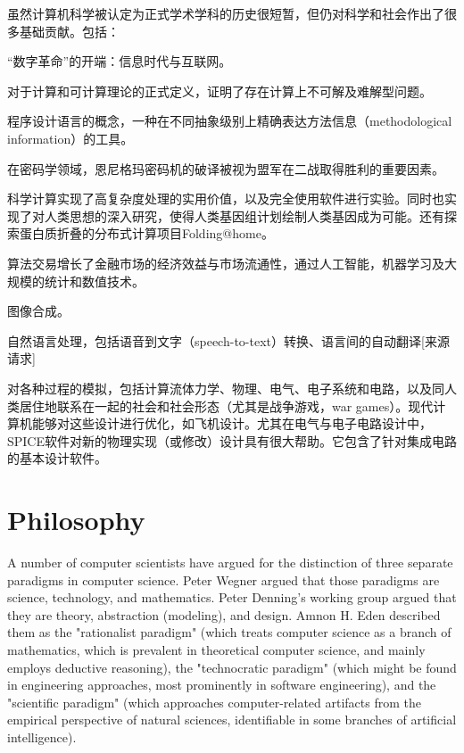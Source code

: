 虽然计算机科学被认定为正式学术学科的历史很短暂，但仍对科学和社会作出了很多基础贡献。包括：


\begin{compactitem}
\item “数字革命”的开端：信息时代与互联网。

\item 对于计算和可计算理论的正式定义，证明了存在计算上不可解及难解型问题。

\item 程序设计语言的概念，一种在不同抽象级别上精确表达方法信息（methodological information）的工具。

\item 在密码学领域，恩尼格玛密码机的破译被视为盟军在二战取得胜利的重要因素。

\item 科学计算实现了高复杂度处理的实用价值，以及完全使用软件进行实验。同时也实现了对人类思想的深入研究，使得人类基因组计划绘制人类基因成为可能。还有探索蛋白质折叠的分布式计算项目Folding@home。

\item 算法交易增长了金融市场的经济效益与市场流通性，通过人工智能，机器学习及大规模的统计和数值技术。

\item 图像合成。

\item 自然语言处理，包括语音到文字（speech-to-text）转换、语言间的自动翻译[来源请求]
\item 对各种过程的模拟，包括计算流体力学、物理、电气、电子系统和电路，以及同人类居住地联系在一起的社会和社会形态（尤其是战争游戏，war games）。现代计算机能够对这些设计进行优化，如飞机设计。尤其在电气与电子电路设计中，SPICE软件对新的物理实现（或修改）设计具有很大帮助。它包含了针对集成电路的基本设计软件。
\end{compactitem}


\chapter{Philosophy}

A number of computer scientists have argued for the distinction of three separate paradigms in computer science. Peter Wegner argued that those paradigms are science, technology, and mathematics. Peter Denning's working group argued that they are theory, abstraction (modeling), and design. Amnon H. Eden described them as the "rationalist paradigm" (which treats computer science as a branch of mathematics, which is prevalent in theoretical computer science, and mainly employs deductive reasoning), the "technocratic paradigm" (which might be found in engineering approaches, most prominently in software engineering), and the "scientific paradigm" (which approaches computer-related artifacts from the empirical perspective of natural sciences, identifiable in some branches of artificial intelligence).

